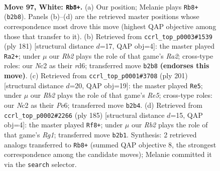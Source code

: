 \documentclass[11pt]{article}
\begin{document}
\clearpage

\begin{figure}[p]\centering
\begin{subfigure}{0.46\textwidth}\centering
\resizebox{\linewidth}{!}{%
\newchessgame
\chessboard[
  setfen={7k/6p1/5p2/7p/7P/6PK/1RNr4/8 w - - 18 97},
  showmover=false,
  pgfstyle=straightmove, color=movearrow, markmove={b2-b8}
]}
\caption{}
\end{subfigure}\hfill
\begin{subfigure}{0.46\textwidth}\centering
\resizebox{\linewidth}{!}{%
\newchessgame
\chessboard[
  setfen={8/r7/3R2pk/7p/7P/5PP1/5K2/8 b - - 49 91},
  showmover=false,
  pgfstyle=straightmove, color=movearrow, markmove={a7-a2}
]}
\caption{}
\end{subfigure}
\\[4pt]
\begin{subfigure}{0.46\textwidth}\centering
\resizebox{\linewidth}{!}{%
\newchessgame
\chessboard[
  setfen={8/8/3Rp1k1/6p1/4r1Pp/7P/5P2/5K2 b - - 90 101},
  showmover=false,
  pgfstyle=straightmove, color=movearrow, markmove={e4-e5}
]}
\caption{}
\end{subfigure}\hfill
\begin{subfigure}{0.46\textwidth}\centering
\resizebox{\linewidth}{!}{%
\newchessgame
\chessboard[
  setfen={6r1/8/R5pk/7p/7P/5KP1/8/8 b - - 73 93},
  showmover=false,
  pgfstyle=straightmove, color=movearrow, markmove={g8-f8}
]}
\caption{}
\end{subfigure}
\caption{\textbf{Move 97, White: \texttt{Rb8+}.} (a) Our position; Melanie plays \texttt{Rb8+} (\texttt{b2b8}). Panels (b)--(d) are the retrieved master positions whose correspondence most drove this move (highest QAP objective among those that transfer to it). (b) Retrieved from \texttt{ccrl\_top\_p0003\#1539} (ply 181) [structural distance $d$=17, QAP obj=4]: the master played \texttt{Ra2+}; under $\mu$ our \emph{Rb2} plays the role of that game's \emph{Ra2}; cross-type roles: our \emph{N}c2 as their \emph{r}d6; transferred move \texttt{b2b8} \textbf{(endorses this move)}. (c) Retrieved from \texttt{ccrl\_top\_p0001\#3708} (ply 201) [structural distance $d$=20, QAP obj=19]: the master played \texttt{Re5}; under $\mu$ our \emph{Rb2} plays the role of that game's \emph{Re5}; cross-type roles: our \emph{N}c2 as their \emph{P}e6; transferred move \texttt{b2b4}. (d) Retrieved from \texttt{ccrl\_top\_p0002\#2266} (ply 185) [structural distance $d$=15, QAP obj=4]: the master played \texttt{Rf8+}; under $\mu$ our \emph{Rb2} plays the role of that game's \emph{Rg1}; transferred move \texttt{b2b1}. Synthesis: 2 retrieved analogs transferred to \texttt{Rb8+} (summed QAP objective 8, the strongest correspondence among the candidate moves); Melanie committed it via the \texttt{search} selector.}
\label{fig:thought-m192}
\end{figure}
\end{document}
